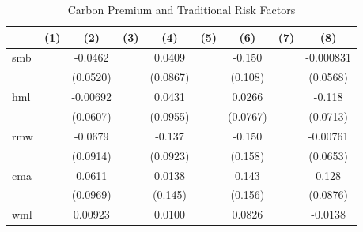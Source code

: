\begin{table}[htbp]\centering
\def\sym#1{\ifmmode^{#1}\else\(^{#1}\)\fi}
\caption{Carbon Premium and Traditional Risk Factors}
\begin{tabular}{l*{8}{c}}
\hline\hline
                    &\multicolumn{1}{c}{(1)}         &\multicolumn{1}{c}{(2)}         &\multicolumn{1}{c}{(3)}         &\multicolumn{1}{c}{(4)}         &\multicolumn{1}{c}{(5)}         &\multicolumn{1}{c}{(6)}         &\multicolumn{1}{c}{(7)}         &\multicolumn{1}{c}{(8)}         \\
\hline
smb                 &                     &     -0.0462         &                     &      0.0409         &                     &      -0.150         &                     &   -0.000831         \\
                    &                     &    (0.0520)         &                     &    (0.0867)         &                     &     (0.108)         &                     &    (0.0568)         \\
[1em]
hml                 &                     &    -0.00692         &                     &      0.0431         &                     &      0.0266         &                     &      -0.118         \\
                    &                     &    (0.0607)         &                     &    (0.0955)         &                     &    (0.0767)         &                     &    (0.0713)         \\
[1em]
rmw                 &                     &     -0.0679         &                     &      -0.137         &                     &      -0.150         &                     &    -0.00761         \\
                    &                     &    (0.0914)         &                     &    (0.0923)         &                     &     (0.158)         &                     &    (0.0653)         \\
[1em]
cma                 &                     &      0.0611         &                     &      0.0138         &                     &       0.143         &                     &       0.128         \\
                    &                     &    (0.0969)         &                     &     (0.145)         &                     &     (0.156)         &                     &    (0.0876)         \\
[1em]
wml                 &                     &     0.00923         &                     &      0.0100         &                     &      0.0826         &                     &     -0.0138         \\

\end{tabular}
\end{table}
